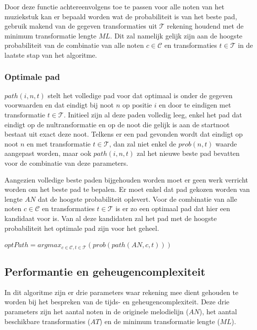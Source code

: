 Door deze functie achtereenvolgens toe te passen voor alle noten van het muziekstuk kan er bepaald worden wat de probabiliteit is van het beste pad, gebruik makend van de gegeven transformaties uit $\mathcal{T}$ rekening houdend met de minimum transformatie lengte $ML$. Dit zal namelijk gelijk zijn aan de hoogste probabiliteit van de combinatie van alle noten $c\in \mathcal{C}$ en transformaties $t\in \mathcal{T}$ in de laatste stap van het algoritme.

\subsubsection{Optimale pad}
$path(i,n,t)$ stelt het volledige pad voor dat optimaal is onder de gegeven voorwaarden en dat eindigt bij noot $n$ op positie $i$ en door te eindigen met transformatie $t\in \mathcal{T}$. Initieel zijn al deze paden volledig leeg, enkel het pad dat eindigt op de nultransformatie en op de noot die gelijk is aan de startnoot bestaat uit exact deze noot. Telkens er een pad gevonden wordt dat eindigt op  noot $n$ en met transformatie $t\in \mathcal{T}$, dan zal niet enkel de $prob(n,t)$ waarde aangepast worden, maar ook $path(i,n,t)$ zal het nieuwe beste pad bevatten voor de combinatie van deze parameters.

Aangezien volledige beste paden bijgehouden worden moet er geen werk verricht worden om het beste pad te bepalen. Er moet enkel dat pad gekozen worden van lengte $AN$ dat de hoogste probabiliteit oplevert. Voor de combinatie van alle noten $c\in \mathcal{C}$ en transformaties $t\in \mathcal{T}$ is er zo een optimaal pad dat hier een kandidaat voor is. Van al deze kandidaten zal het pad met de hoogste probabiliteit het optimale pad zijn voor het geheel.

\begin{framed}
\noindent
$optPath=argmax_{c\in \mathcal{C}, t\in \mathcal{T}}(prob(path(AN,c,t)))$
\end{framed}

\subsection{Performantie en geheugencomplexiteit}
In dit algoritme zijn er drie parameters waar rekening mee dient gehouden te worden bij het bespreken van de tijds- en geheugencomplexiteit. Deze drie parameters zijn het aantal noten in de originele melodielijn ($AN$), het aantal beschikbare transformaties ($AT$) en de minimum transformatie lengte ($ML$).

